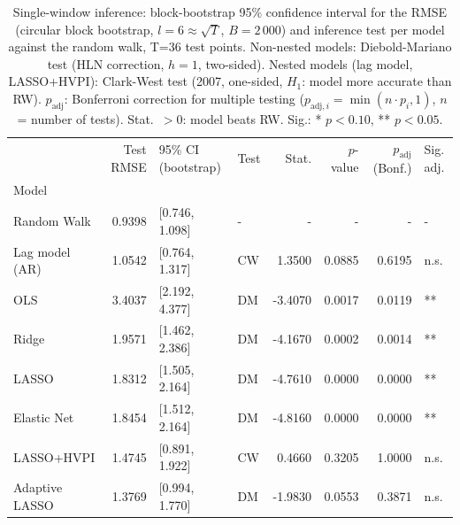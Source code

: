 \begin{table}
\caption{Single-window inference: block-bootstrap 95\% confidence interval for the RMSE (circular block bootstrap, $l=6\approx\sqrt{T}$, $B=2\,000$) and inference test per model against the random walk, T=36 test points. Non-nested models: Diebold-Mariano test (HLN correction, $h=1$, two-sided). Nested models (lag model, LASSO+HVPI): Clark-West test (2007, one-sided, $H_1$: model more accurate than RW).  $p_{\mathrm{adj}}$: Bonferroni correction for multiple testing ($p_{\mathrm{adj},i}=\min(n\cdot p_i,1)$, $n$ = number of tests). Stat.\ $> 0$: model beats RW. Sig.: * $p<0.10$, ** $p<0.05$.}
\label{tab:inferenz}
\begin{tabular}{lrllrrrl}
\toprule
 & Test RMSE & 95\% CI (bootstrap) & Test & Stat. & $p$-value & $p_{\mathrm{adj}}$ (Bonf.) & Sig. adj. \\
Model &  &  &  &  &  &  &  \\
\midrule
Random Walk & 0.9398 & [0.746, 1.098] & - & - & - & - & - \\
Lag model (AR) & 1.0542 & [0.764, 1.317] & CW & 1.3500 & 0.0885 & 0.6195 & n.s. \\
OLS & 3.4037 & [2.192, 4.377] & DM & -3.4070 & 0.0017 & 0.0119 & ** \\
Ridge & 1.9571 & [1.462, 2.386] & DM & -4.1670 & 0.0002 & 0.0014 & ** \\
LASSO & 1.8312 & [1.505, 2.164] & DM & -4.7610 & 0.0000 & 0.0000 & ** \\
Elastic Net & 1.8454 & [1.512, 2.164] & DM & -4.8160 & 0.0000 & 0.0000 & ** \\
LASSO+HVPI & 1.4745 & [0.891, 1.922] & CW & 0.4660 & 0.3205 & 1.0000 & n.s. \\
Adaptive LASSO & 1.3769 & [0.994, 1.770] & DM & -1.9830 & 0.0553 & 0.3871 & n.s. \\
\bottomrule
\end{tabular}
\end{table}

